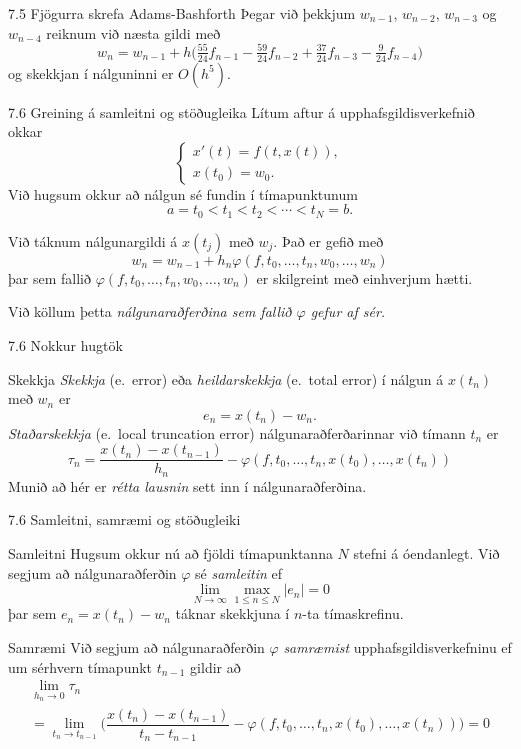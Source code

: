 \begin{frame}{7.5 Fjögurra skrefa Adams-Bashforth} 
Þegar við þekkjum $w_{n-1}$, $w_{n-2}$, $w_{n-3}$ og $w_{n-4}$ 
reiknum við næsta gildi með
\begin{equation*}
  w_{n} = w_{n-1} + h\big(\tfrac{55}{24}f_{n-1} - \tfrac{59}{24}f_{n-2} + 
\tfrac {37}{24}f_{n-3} -\tfrac 9{24}f_{n-4}\big)
\end{equation*}
og skekkjan í nálguninni er $O(h^5)$.
\end{frame}


\begin{frame}{7.6  Greining á samleitni og stöðugleika} 
Lítum aftur á upphafsgildisverkefnið okkar
$$
\begin{cases}
  x'(t)=f(t,x(t)),\\
x(t_0)=w_0.
\end{cases}
$$
Við hugsum okkur að nálgun sé fundin í tímapunktunum
$$a=t_0<t_1<t_2<\cdots<t_N=b.$$

\pause
\smallskip
Við táknum nálgunargildi  á $x(t_j)$ með $w_j$. 
Það er gefið með 
$$
w_n=w_{n-1}+h_n\varphi(f,t_{0},\dots,t_n,w_{0},\dots,w_{n})
$$
þar sem fallið $\varphi(f,t_{0},\dots,t_n,w_{0},\dots,w_{n})$
er skilgreint með einhverjum hætti.  

\pause
\smallskip
Við köllum þetta {\it nálgunaraðferðina sem fallið
$\varphi$ gefur af sér.} 
\end{frame}


\begin{frame}{7.6 Nokkur hugtök} 
\begin{block}{Skekkja}
{\it Skekkja} (e.~error) eða  {\it heildarskekkja} 
(e.~total error) í nálgun
á $x(t_n)$ með $w_n$ er 
$$
e_n=x(t_n)-w_n.
$$
\pause
{\it Staðarskekkja} (e.~local truncation error)
nálgunaraðferðarinnar við tímann $t_n$ er
$$
\tau_n=\dfrac{x(t_n)-x(t_{n-1})}{h_n}
-\varphi(f,t_{0},\dots,t_n,x(t_{0}),\dots,x(t_{n}))
$$
Munið að hér er {\it rétta lausnin} sett inn í 
nálgunaraðferðina.
\end{block}
\end{frame}


\begin{frame}{7.6 Samleitni, samræmi og stöðugleiki} 
\begin{block}{Samleitni}  Hugsum okkur nú að fjöldi tímapunktanna 
$N$ stefni á óendanlegt. Við segjum að nálgunaraðferðin $\varphi$
sé {\it samleitin} ef 
$$
\lim_{N\to \infty} \max\limits_{1\leq n\leq N} |e_n|=0
$$
þar sem $e_n=x(t_n)-w_n$ táknar skekkjuna í $n$-ta tímaskrefinu. 
\end{block}
\pause
\begin{block}{Samræmi}
Við segjum að nálgunaraðferðin $\varphi$
{\it samræmist} upphafsgildisverkefninu ef um sérhvern tímapunkt
$t_{n-1}$  gildir að 
\begin{multline*}
\lim_{h_n\to 0}\tau_n\\
=\lim_{t_n\to t_{n-1}}\bigg(\dfrac{x(t_n)-x(t_{n-1})}{t_n-t_{n-1}}
-\varphi(f,t_{0},\dots,t_n,x(t_{0}),\dots,x(t_{n}))\bigg)
=0  
\end{multline*}
\end{block}
\end{frame}



